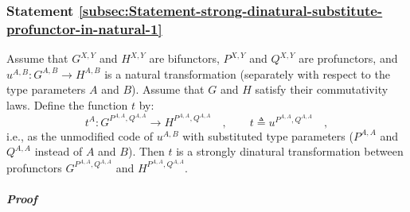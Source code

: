 \subsubsection{Statement \label{subsec:Statement-strong-dinatural-substitute-profunctor-in-natural-1}\ref{subsec:Statement-strong-dinatural-substitute-profunctor-in-natural-1}}

Assume that $G^{X,Y}$ and $H^{X,Y}$ are bifunctors, $P^{X,Y}$ and
$Q^{X,Y}$ are profunctors, and $u^{A,B}:G^{A,B}\rightarrow H^{A,B}$
is a natural transformation (separately with respect to the type parameters
$A$ and $B$). Assume that $G$ and $H$ satisfy their commutativity
laws. Define the function $t$ by:
\[
t^{A}:G^{P^{A,A},Q^{A,A}}\rightarrow H^{P^{A,A},Q^{A,A}}\quad,\quad\quad t\triangleq u^{P^{A,A},Q^{A,A}}\quad,
\]
i.e., as the unmodified code of $u^{A,B}$ with substituted type parameters
($P^{A,A}$ and $Q^{A,A}$ instead of $A$ and $B$). Then $t$ is
a strongly dinatural transformation between profunctors $G^{P^{A,A},Q^{A,A}}$
and $H^{P^{A,A},Q^{A,A}}$.

\subparagraph{Proof}

